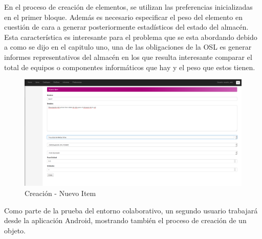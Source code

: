 \documentclass[a4paper,11pt]{book}
\begin{document}
En el proceso de creación de elementos, se utilizan las preferencias inicializadas en el primer bloque. Además es necesario especificar el peso del elemento en cuestión de cara a generar posteriormente estadísticos del estado del almacén. Esta característica es interesante para el problema que se esta abordando debido a como se dijo en el capitulo uno, una de las obligaciones de la OSL es generar informes representativos del almacén en los que resulta interesante comparar el total de equipos o componentes informáticos que hay y el peso que estos tienen. 
\begin{figure}[H] 
\centering 
\includegraphics[scale=0.3]{imagenes/pruebas/nuevo_item.png}
\caption{ Creación - Nuevo Item\cite{propio}}
\end{figure}

Como parte de la prueba del entorno colaborativo, un segundo usuario trabajará desde la aplicación Android, mostrando también el proceso de creación de un objeto. 
\end{document}
